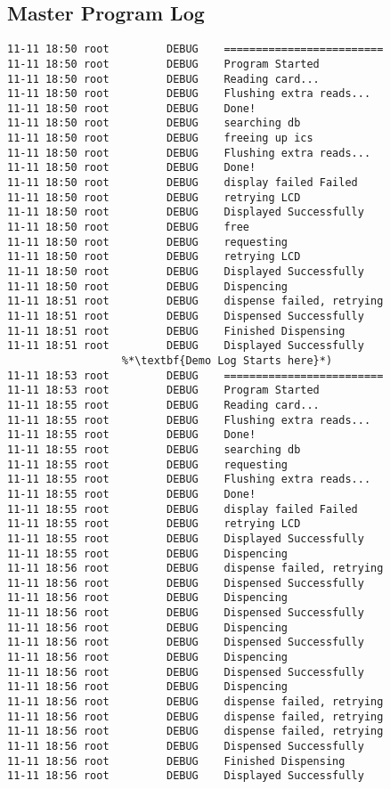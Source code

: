 \documentclass[a4paper,11pt]{article}
\numberwithin{figure}{section}
\numberwithin{table}{section}
\begin{document}
\begin{appendices}
\section{Master Program Log}\thispagestyle{sectionstart}
\label{sec:maslog}
\begin{lstlisting}
11-11 18:50 root         DEBUG    =========================
11-11 18:50 root         DEBUG    Program Started
11-11 18:50 root         DEBUG    Reading card...
11-11 18:50 root         DEBUG    Flushing extra reads...
11-11 18:50 root         DEBUG    Done!
11-11 18:50 root         DEBUG    searching db
11-11 18:50 root         DEBUG    freeing up ics
11-11 18:50 root         DEBUG    Flushing extra reads...
11-11 18:50 root         DEBUG    Done!
11-11 18:50 root         DEBUG    display failed Failed
11-11 18:50 root         DEBUG    retrying LCD
11-11 18:50 root         DEBUG    Displayed Successfully
11-11 18:50 root         DEBUG    free
11-11 18:50 root         DEBUG    requesting
11-11 18:50 root         DEBUG    retrying LCD
11-11 18:50 root         DEBUG    Displayed Successfully
11-11 18:50 root         DEBUG    Dispencing
11-11 18:51 root         DEBUG    dispense failed, retrying
11-11 18:51 root         DEBUG    Dispensed Successfully
11-11 18:51 root         DEBUG    Finished Dispensing
11-11 18:51 root         DEBUG    Displayed Successfully
				  %*\textbf{Demo Log Starts here}*)
11-11 18:53 root         DEBUG    =========================
11-11 18:53 root         DEBUG    Program Started
11-11 18:55 root         DEBUG    Reading card...
11-11 18:55 root         DEBUG    Flushing extra reads...
11-11 18:55 root         DEBUG    Done!
11-11 18:55 root         DEBUG    searching db
11-11 18:55 root         DEBUG    requesting
11-11 18:55 root         DEBUG    Flushing extra reads...
11-11 18:55 root         DEBUG    Done!
11-11 18:55 root         DEBUG    display failed Failed
11-11 18:55 root         DEBUG    retrying LCD
11-11 18:55 root         DEBUG    Displayed Successfully
11-11 18:55 root         DEBUG    Dispencing
11-11 18:56 root         DEBUG    dispense failed, retrying
11-11 18:56 root         DEBUG    Dispensed Successfully
11-11 18:56 root         DEBUG    Dispencing
11-11 18:56 root         DEBUG    Dispensed Successfully
11-11 18:56 root         DEBUG    Dispencing
11-11 18:56 root         DEBUG    Dispensed Successfully
11-11 18:56 root         DEBUG    Dispencing
11-11 18:56 root         DEBUG    Dispensed Successfully
11-11 18:56 root         DEBUG    Dispencing
11-11 18:56 root         DEBUG    dispense failed, retrying
11-11 18:56 root         DEBUG    dispense failed, retrying
11-11 18:56 root         DEBUG    dispense failed, retrying
11-11 18:56 root         DEBUG    Dispensed Successfully
11-11 18:56 root         DEBUG    Finished Dispensing
11-11 18:56 root         DEBUG    Displayed Successfully


\end{lstlisting}
\end{appendices}
\end{document}
